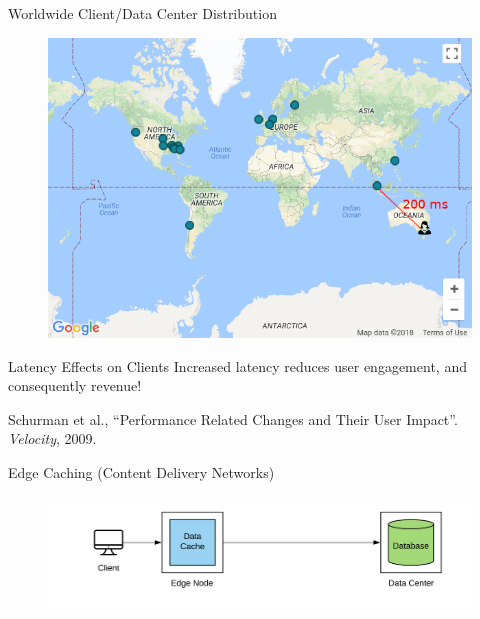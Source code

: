 \documentclass[10pt]{beamer}
\begin{document}
\begin{frame}{Worldwide Client/Data Center Distribution}
    \begin{figure}
        \center
        \includegraphics[scale=0.45]{apollo_google_oceania}
    \end{figure}
\end{frame}

\begin{frame}{Latency Effects on Clients}
    Increased latency reduces \alert{user engagement}, and consequently \alert{revenue}! \\
    \vspace{1cm}

    \small{Schurman et al., ``Performance Related Changes and Their User Impact''. \emph{Velocity}, 2009.}
\end{frame}

\begin{frame}{Edge Caching (Content Delivery Networks)}
    \begin{figure}
        \center
        \hspace*{-1.5cm}
        \includegraphics[scale=0.17]{apollo_edge_cache}
    \end{figure}
\end{frame}
\end{document}
